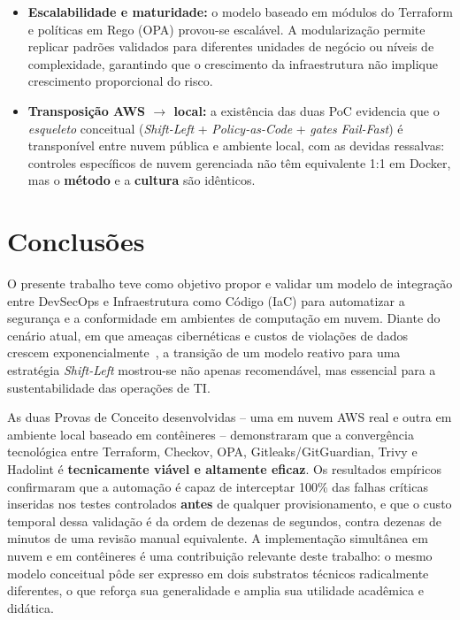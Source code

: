 \begin{itemize}
    \item \textbf{Escalabilidade e maturidade:} o modelo baseado em módulos do Terraform e políticas em Rego (OPA) provou-se escalável. A modularização permite replicar padrões validados para diferentes unidades de negócio ou níveis de complexidade, garantindo que o crescimento da infraestrutura não implique crescimento proporcional do risco.

    \item \textbf{Transposição AWS $\rightarrow$ local:} a existência das duas PoC evidencia que o \textit{esqueleto} conceitual (\textit{Shift-Left} + \textit{Policy-as-Code} + \textit{gates} \textit{Fail-Fast}) é transponível entre nuvem pública e ambiente local, com as devidas ressalvas: controles específicos de nuvem gerenciada não têm equivalente 1:1 em Docker, mas o \textbf{método} e a \textbf{cultura} são idênticos.
\end{itemize}

\section{Conclusões}
\label{sec:conclusoes}

O presente trabalho teve como objetivo propor e validar um modelo de integração entre DevSecOps e Infraestrutura como Código (IaC) para automatizar a segurança e a conformidade em ambientes de computação em nuvem. Diante do cenário atual, em que ameaças cibernéticas e custos de violações de dados crescem exponencialmente~, a transição de um modelo reativo para uma estratégia \textit{Shift-Left} mostrou-se não apenas recomendável, mas essencial para a sustentabilidade das operações de TI.

As duas Provas de Conceito desenvolvidas -- uma em nuvem AWS real e outra em ambiente local baseado em contêineres -- demonstraram que a convergência tecnológica entre Terraform, Checkov, OPA, Gitleaks/GitGuardian, Trivy e Hadolint é \textbf{tecnicamente viável e altamente eficaz}. Os resultados empíricos confirmaram que a automação é capaz de interceptar 100\% das falhas críticas inseridas nos testes controlados \textbf{antes} de qualquer provisionamento, e que o custo temporal dessa validação é da ordem de dezenas de segundos, contra dezenas de minutos de uma revisão manual equivalente. A implementação simultânea em nuvem e em contêineres é uma contribuição relevante deste trabalho: o mesmo modelo conceitual pôde ser expresso em dois substratos técnicos radicalmente diferentes, o que reforça sua generalidade e amplia sua utilidade acadêmica e didática.

